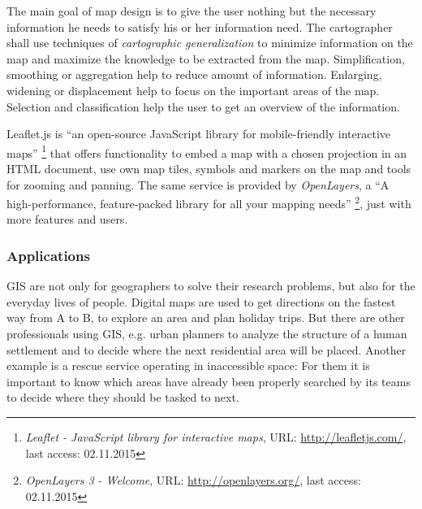 The main goal of map design is to give the user nothing but the necessary information he needs to satisfy his or her information need. The cartographer shall use techniques of \emph{cartographic generalization} to minimize information on the map and maximize the knowledge to be extracted from the map. Simplification, smoothing or aggregation help to reduce amount of information. Enlarging, widening or displacement help to focus on the important areas of the map. Selection and classification help the user to get an overview of the information.
\cite{krygier2005making}

Leaflet.js is ``an open-source JavaScript library for mobile-friendly interactive maps''
\footnote{
  \textit{Leaflet - JavaScript library for interactive maps},
  URL: \url{http://leafletjs.com/},
  last access: 02.11.2015
}
that offers functionality to embed a map with a chosen projection in an HTML document, use own map tiles, symbols and markers on the map and tools for zooming and panning.
The same service is provided by \emph{OpenLayers}, a ``A high-performance, feature-packed library for all your mapping needs''
\footnote{
  \textit{OpenLayers 3 - Welcome},
  URL: \url{http://openlayers.org/},
  last access: 02.11.2015
}, just with more features and users.




\subsubsection{Applications} %
\label{ssub:gis_applications}

GIS are not only for geographers to solve their research problems, but also for the everyday lives of people. Digital maps are used to get directions on the fastest way from A to B, to explore an area and plan holiday trips. But there are other professionals using GIS, e.g. urban planners to analyze the structure of a human settlement and to decide where the next residential area will be placed. Another example is a rescue service operating in inaccessible space: For them it is important to know which areas have already been properly searched by its teams to decide where they should be tasked to next.


